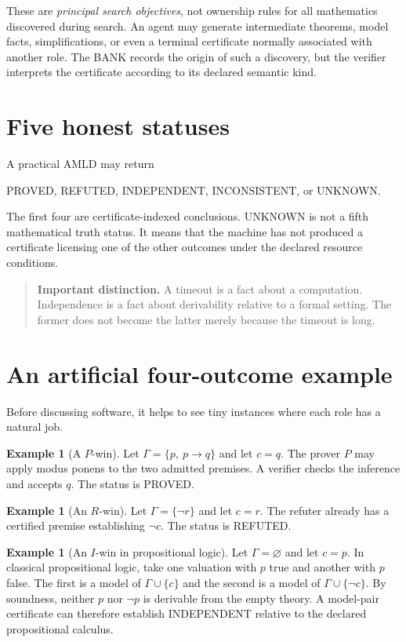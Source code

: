 \documentclass[11pt,openany]{book}
\theoremstyle{definition}
\newtheorem{example}[theorem]{Example}
\theoremstyle{remark}
\newenvironment{warningbox}{\begin{quote}\small\color{red!50!black}\textbf{Important distinction.} }{\end{quote}}
\begin{document}
These are \emph{principal search objectives}, not ownership rules for all mathematics discovered during search. An agent may generate intermediate theorems, model facts, simplifications, or even a terminal certificate normally associated with another role. The BANK records the origin of such a discovery, but the verifier interprets the certificate according to its declared semantic kind.

\section{Five honest statuses}
A practical AMLD may return
\begin{center}
\textsf{PROVED}, \textsf{REFUTED}, \textsf{INDEPENDENT}, \textsf{INCONSISTENT}, or \textsf{UNKNOWN}.
\end{center}
The first four are certificate-indexed conclusions. \textsf{UNKNOWN} is not a fifth mathematical truth status. It means that the machine has not produced a certificate licensing one of the other outcomes under the declared resource conditions.

\begin{warningbox}
A timeout is a fact about a computation. Independence is a fact about derivability relative to a formal setting. The former does not become the latter merely because the timeout is long.
\end{warningbox}

\section{An artificial four-outcome example}
Before discussing software, it helps to see tiny instances where each role has a natural job.

\begin{example}[A $P$-win]
Let $\Gamma=\{p,\ p\to q\}$ and let $c=q$. The prover $P$ may apply modus ponens to the two admitted premises. A verifier checks the inference and accepts $q$. The status is \textsf{PROVED}.
\end{example}

\begin{example}[An $R$-win]
Let $\Gamma=\{\neg r\}$ and let $c=r$. The refuter already has a certified premise establishing $\neg c$. The status is \textsf{REFUTED}.
\end{example}

\begin{example}[An $I$-win in propositional logic]
Let $\Gamma=\varnothing$ and let $c=p$. In classical propositional logic, take one valuation with $p$ true and another with $p$ false. The first is a model of $\Gamma\cup\{c\}$ and the second is a model of $\Gamma\cup\{\neg c\}$. By soundness, neither $p$ nor $\neg p$ is derivable from the empty theory. A model-pair certificate can therefore establish \textsf{INDEPENDENT} relative to the declared propositional calculus.
\end{example}
\end{document}

